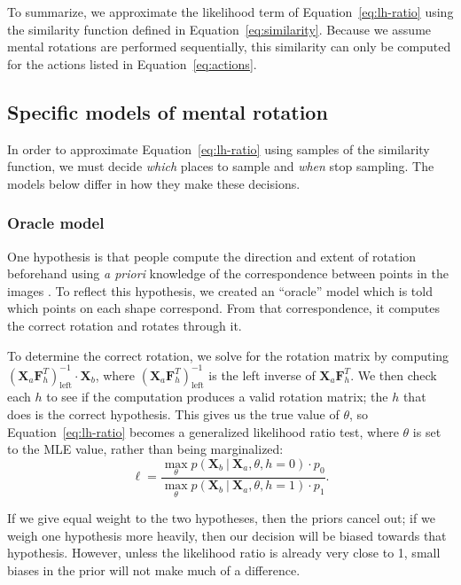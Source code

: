 \documentclass[10pt,letterpaper]{article}
\newcommand{\Xa}[0]{\mathbf{X}_a}
\newcommand{\Xb}[0]{\mathbf{X}_b}
\newcommand{\F}[0]{\mathbf{F}}
\newcommand{\hi}[0]{h=0}
\newcommand{\hf}[0]{h=1}
\begin{document}
To summarize, we approximate the likelihood term of
Equation~\ref{eq:lh-ratio} using the similarity function defined in
Equation~\ref{eq:similarity}. Because we assume mental rotations are
performed sequentially, this similarity can only be computed for the
actions listed in Equation~\ref{eq:actions}.

\subsection{Specific models of mental rotation}

In order to approximate Equation~\ref{eq:lh-ratio} using samples of
the similarity function, we must decide \textit{which} places to
sample and \textit{when} stop sampling. The models below differ in how
they make these decisions.

\subsubsection{Oracle model}

One hypothesis is that people compute the direction and extent of
rotation beforehand using \textit{a priori} knowledge of the
correspondence between points in the images
\cite{Funt:1983wn,Just:1985uu}.  To reflect this hypothesis, we
created an ``oracle'' model which is told which points on each shape
correspond. From that correspondence, it computes the correct rotation
and rotates through it.

To determine the correct rotation, we solve for the rotation matrix by
computing $(\Xa \F_h^T)_\mathrm{left}^{-1}\cdot{}\Xb$, where
$(\Xa\F_h^T)_\mathrm{left}^{-1}$ is the left inverse of
$\Xa\F_h^T$. We then check each $h$ to see if the computation produces
a valid rotation matrix; the $h$ that does is the correct
hypothesis. This gives us the true value of $\theta$, so
Equation~\ref{eq:lh-ratio} becomes a generalized likelihood ratio
test, where $\theta$ is set to the MLE value, rather than being
marginalized:
\begin{equation}
  \ell = \frac{\max_\theta p(\Xb\ \vert\ \Xa, \theta, \hi)\cdot{}p_0}{\max_\theta p(\Xb\ \vert\ \Xa, \theta, \hf)\cdot{}p_1}.
  \label{eq:mle-lh-ratio}
\end{equation}

If we give equal weight to the two hypotheses, then the priors cancel
out; if we weigh one hypothesis more heavily, then our decision will
be biased towards that hypothesis. However, unless the likelihood
ratio is already very close to 1, small biases in the prior will not
make much of a difference.
\end{document}
